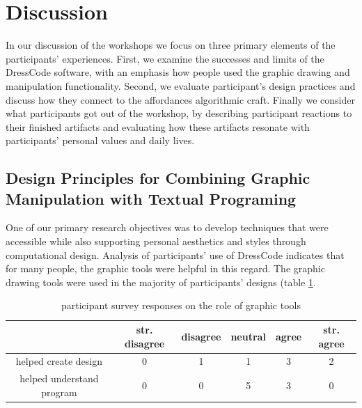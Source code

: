 \documentclass{sigchi}
\newcommand\tabhead[1]{\small\textbf{#1}}
\begin{document}
\section{Discussion}
In our discussion of the workshops we focus on three primary elements of the participants' experiences. First, we examine the successes and limits of the DressCode software, with an emphasis how people used the graphic drawing and manipulation functionality. Second, we evaluate participant's design practices and discuss how they connect to the  affordances algorithmic craft. Finally we consider what participants got out of the workshop, by describing participant reactions to their finished artifacts and evaluating how these artifacts resonate with participants' personal values and daily lives.

\subsection{Design Principles for Combining Graphic Manipulation with Textual Programing}
	One of our primary research objectives was to develop techniques that were accessible while also supporting personal aesthetics and styles through computational design. Analysis of participants' use of DressCode indicates that for many people, the graphic tools were helpful in this regard. The graphic drawing tools were used in the majority of participants' designs (table \ref{table:graphic_tools}. 

\begin{table}
  \centering
  \begin{tabular}{|c|c|c|c|c|c|}
    \hline
    \multicolumn{1}{|p{0.75cm}|}{\centering\tabhead{}} &
    \multicolumn{1}{|p{1cm}|}{\centering\small{str. disagree}} &
    \multicolumn{1}{|p{0.8cm}|}{\centering\small{disagree}}&
    \multicolumn{1}{|p{0.8cm}|}{\centering\small{neutral}}&
    \multicolumn{1}{|p{0.8cm}|}{\centering\small{agree}}&
    \multicolumn{1}{|p{0.8cm}|}{\centering\small{str. agree}}\\
    \hline
    \small{helped create design} & 0 & 1 & 1 & 3 & 2 \\
    \hline
    \small{helped understand program} & 0 & 0 & 5 & 3& 0  \\
    \hline
  \end{tabular}
  \caption{participant survey responses on the role of graphic tools}
\label{table:graphic_tools}
\end{table}
\end{document}
